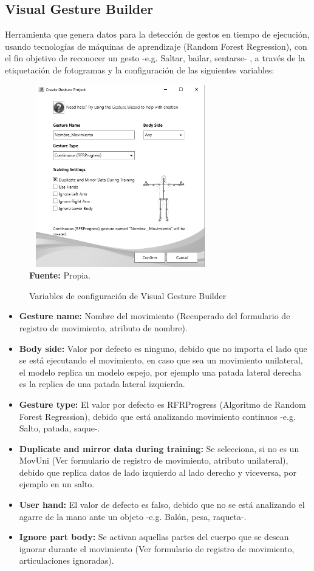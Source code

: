 \subsection{Visual Gesture Builder} \label{ins:VisualGestureBuilder}
Herramienta que genera datos para la detecci\'on de gestos en tiempo de ejecuci\'on, usando tecnolog\'ias de m\'aquinas de aprendizaje (Random Forest Regression), con el fin objetivo de reconocer un gesto -e.g. Saltar, bailar, sentarse- \cite{KinectBuilder2019}, a trav\'es de la etiquetaci\'on de fotogramas y la configuraci\'on de las siguientes variables:
 \begin{figure}[H]
	\caption{Variables de configuraci\'on de Visual Gesture Builder}
	\label{fig:visualGesture}
	\centering
	\includegraphics[width=300px,height=300px]{graphics/settingsGesture.PNG} \\
	\textbf{Fuente:} Propia.
\end{figure} 
\begin{itemize}
\item \textbf{Gesture name:} Nombre del movimiento  (Recuperado del formulario de registro de movimiento, atributo de nombre).
\item \textbf{Body side:} Valor por defecto es  ninguno, debido que no importa el lado que se est\'a ejecutando el movimiento, en caso que sea un movimiento unilateral, el modelo replica un modelo espejo, por ejemplo una patada lateral derecha es la replica de una patada lateral izquierda.
\item \textbf{Gesture type:} El valor por defecto es RFRProgress (Algoritmo de Random Forest Regression), debido que est\'a analizando movimiento continuos -e.g. Salto, patada, saque-.
\item \textbf{Duplicate and mirror data during training:} Se selecciona, si no es un \gls{MovUni} (Ver formulario de registro de movimiento, atributo unilateral), debido que replica datos de lado izquierdo al lado derecho y viceversa, por ejemplo en un salto.
\item \textbf{User hand:} El valor de defecto es falso, debido que no se est\'a analizando el agarre de la mano ante un objeto -e.g. Bal\'on, pesa, raqueta-.
\item \textbf{Ignore part body:} Se activan  aquellas partes del cuerpo que se desean ignorar durante el movimiento (Ver formulario de registro de movimiento, articulaciones ignoradas).
\end{itemize}
